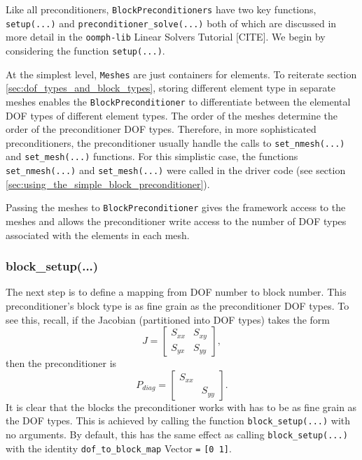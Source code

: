 Like all preconditioners, \verb+BlockPreconditioners+ have two key
functions, \verb+setup(...)+ and \verb+preconditioner_solve(...)+ both of which are discussed in more detail in the \verb+oomph-lib+ Linear Solvers Tutorial [CITE]. We begin by considering the function \verb+setup(...)+.

At the simplest level, \verb+Meshes+ are just containers for elements. To reiterate section \ref{sec:dof_types_and_block_types}, storing different element type in separate meshes enables the \verb+BlockPreconditioner+ to differentiate between the elemental DOF types of different element types. The order of the meshes determine the order of the preconditioner DOF types.
Therefore, in more sophisticated preconditioners, the preconditioner usually handle the calls to \verb+set_nmesh(...)+ and \verb+set_mesh(...)+ functions. For this simplistic case, the functions \verb+set_nmesh(...)+ and \verb+set_mesh(...)+ were called in the driver code (see section \ref{sec:using_the_simple_block_preconditioner}).

Passing the meshes to \verb+BlockPreconditioner+ gives the framework access to the
meshes and allows the preconditioner write access to the number of DOF types associated with the elements in each mesh.

\subsubsection{block\_setup(...)\label{sec:block_setup}}
The next step is to define a mapping from DOF number to block
number. This preconditioner's block type is as fine grain as the preconditioner DOF types. To see this, recall, if the Jacobian (partitioned into DOF types) takes the form 
\begin{equation*}
J =
\begin{bmatrix}
S_{xx}&S_{xy} \\
S_{yx}&S_{yy}
\end{bmatrix},
\end{equation*}
then the preconditioner is
\begin{equation*}
P_{diag} =
\begin{bmatrix}
S_{xx}& \\
      &S_{yy}
\end{bmatrix}.
\end{equation*}
It is clear that the blocks the preconditioner works with has to be as fine grain as the DOF types. This is achieved by calling the function \verb+block_setup(...)+ with no arguments. By default, this has the same effect as calling \verb+block_setup(...)+ with the identity \verb+dof_to_block_map+ Vector \verb+=+ \verb+[0 1]+.


